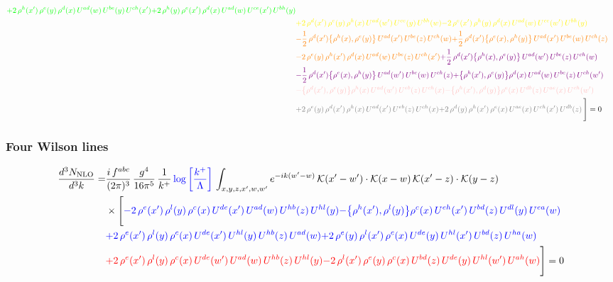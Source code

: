 \documentclass[9pt]{article}
\numberwithin{equation}{section}
\begin{document}
\begin{align}
{\color{green}+2\,\rho^{h}(x')\,\rho^{e}(y)\,\rho^{d}(x)\,U^{ad}(w)\,U^{be}(y)\,U^{ch}(x')}{\color{green}+2\,\rho^{h}(y)\,\rho^{e}(x')\,\rho^{d}(x)\,U^{ad}(w)\,U^{ce}(x')\,U^{bh}(y)}\notag \\ & {\color{yellow}+2\,\rho^{d}(x')\,\rho^{e}(y)\,\rho^{h}(x)\,U^{ad}(w')\,U^{ce}(y)\,U^{bh}(w)}{\color{yellow}-2\,\rho^{e}(x')\,\rho^{h}(y)\,\rho^{d}(x)\,U^{ad}(w)\,U^{ce}(w')\,U^{bh}(y)}\notag \\ & {\color{orange}-\frac{1}{2}\,\rho^{d}(x')\big\{\rho^{h}(x),\rho^{e}(y)\big\}\,U^{ad}(x')\,U^{be}(z)\,U^{ch}(w)}{\color{orange}+\frac{1}{2}\,\rho^{d}(x')\big\{\rho^{e}(x),\rho^{h}(y)\big\}\,U^{ad}(x')\,U^{be}(w)\,U^{ch}(z)}\notag \\
&{\color{orange}-2\,\rho^{e}(y)\,\rho^{h}(x')\,\rho^{d}(x)\,U^{ad}(w)\,U^{be}(z)\,U^{ch}(x')}{\color{violet}+\frac{1}{2}\,\rho^{d}(x')\big\{\rho^{h}(x),\rho^{e}(y)\big\}\,U^{ad}(w')\,U^{be}(z)\,U^{ch}(w)}\notag \\ & {\color{violet}-\frac{1}{2}\,\rho^{d}(x')\big\{\rho^{e}(x),\rho^{h}(y)\big\}\,U^{ad}(w')\,U^{be}(w)\,U^{ch}(z)}{\color{violet}+\big\{\rho^{h}(x'),\rho^{e}(y)\big\}\rho^{d}(x)\,U^{ad}(w)\,U^{be}(z)\,U^{ch}(w')}\notag \\ &{\color{pink}-\big\{\rho^{d}(x'),\rho^{e}(y)\big\}\rho^{h}(x)\,U^{ad}(w')\,U^{eb}(z)\,U^{ch}(x)}{\color{pink}-\big\{\rho^{h}(x'),\rho^{d}(y)\big\}\rho^{e}(x)\,U^{db}(z)\,U^{ae}(x)\,U^{ch}(w')}\notag \\ &{\color{gray}+2\,\rho^{e}(y)\,\rho^{d}(x')\, \rho^{h}(x)\, U^{ad}(x')\,U^{eb}(z)\,U^{ch}(x)}{\color{gray}+2\,\rho^{d}(y)\,\rho^{h}(x')\,\rho^{e}(x)\,U^{ae}(x)\,U^{ch}(x')\,U^{db}(z)}\,\Bigg] = 0
\end{align}    
\subsubsection{Four Wilson lines}
\begin{align}
    \frac{d^{3}N_{\rm NLO}}{d^{3}k}= & \frac{i\,f^{abc}}{(2\pi)^{3}}\,\frac{g^{4}}{16\pi^{5}}\,\frac{1}{k^{+}}\,{\color{blue}\log{\left[\frac{k^{+}}{\Lambda}\right]}}\,\int_{x,y,z,x',w,w'}e^{-ik(w'-w)}\,\mathcal{K}(x'-w')\cdot\mathcal{K}(x-w)\,\mathcal{K}(x'-z)\cdot\mathcal{K}(y-z)\notag \\ & \times\Bigg[{\color{blue}-2\,\rho^{e}(x')\,\rho^{l}(y)\,\rho^{c}(x)\, U^{de}(x')\,U^{ad}(w)\,U^{hb}(z)\,U^{hl}(y)}{\color{blue}-\big\{\rho^{h}(x'),\rho^{l}(y)\big\}\rho^{c}(x)\,U^{eh}(x')\,U^{bd}(z)\,U^{dl}(y)\,U^{ea}(w)}\notag \\ & {\color{blue}+2\,\rho^{e}(x')\,\rho^{l}(y)\, \rho^{c}(x)\, U^{de}(x')\,U^{hl}(y)\,U^{hb}(z)\,U^{ad}(w)} {\color{blue}+2\,\rho^{e}(y)\,\rho^{l}(x')\, \rho^{c}(x)\, U^{de}(y)\,U^{hl}(x')\,U^{bd}(z)\,U^{ha}(w)}\notag \\ & {\color{red}+2\,\rho^{e}(x')\,\rho^{l}(y)\,\rho^{c}(x)\, U^{de}(w')\,U^{ad}(w)\,U^{hb}(z)\,U^{hl}(y)}{\color{red}-2\,\rho^{l}(x')\,\rho^{e}(y)\, \rho^{c}(x)\, U^{bd}(z)\,U^{de}(y)\,U^{hl}(w')\,U^{ah}(w)}\Bigg] = 0
\end{align}    
\end{document}

